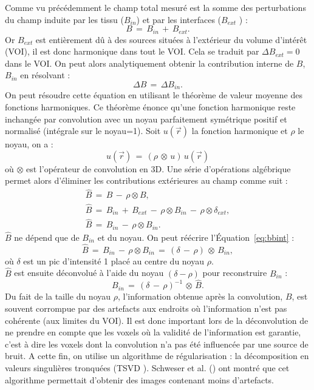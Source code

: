 {Comme vu précédemment le champ total mesuré est la somme des perturbations du champ induite
par les tissu ($B_{in}$) et par les interfaces ($B_{ext}$ ) :
\begin{equation}
B\,=\,B_{in}\,+\,B_{ext}.
\end{equation}
Or $B_{ext}$ est entièrement dû à des sources situées à l’extérieur du volume d’intérêt (VOI), il est donc
harmonique dans tout le VOI. Cela se traduit par $\Delta B_{ext} = 0$ dans le VOI. On peut alors analytiquement
obtenir la contribution interne de $B$, $B_{in}$ en résolvant :
\begin{equation}
\Delta B\,=\,\Delta B_{in}.
\end{equation}
On peut résoudre cette équation en utilisant le théorème de valeur moyenne des fonctions
harmoniques. Ce théorème énonce qu'une fonction harmonique reste inchangée par convolution avec
un noyau parfaitement symétrique positif et normalisé (intégrale sur le noyau=1). Soit $u(\vec{r})$ la fonction
harmonique et $\rho$ le noyau, on a :
\begin{equation}
u(\vec{r})\,=\,(\rho\, \otimes\,u)\,u(\vec{r})
\end{equation}
où $\otimes$ est l'opérateur de convolution en 3D. Une série d’opérations algébrique permet alors d'éliminer
les contributions extérieures au champ comme suit :
\begin{eqnarray}
\hat{B}\,=\,B\,-\,\rho\otimes B,\\
\hat{B}\,=\,B_{in}\,+\,B_{ext}\,-\,\rho\otimes B_{in}\,-\,\rho\otimes\delta_{ext},\\
\hat{B}\,=\,B_{in}\,-\,\rho\otimes B_{in}.\label{eq:bbint}
\end{eqnarray}
$\hat{B}$ ne dépend que de $B_{in}$ et du noyau. On peut réécrire l’Équation~\ref{eq:bbint} :
\begin{equation}
\hat{B}\,=\,B_{in}\,-\,\rho\otimes B_{in}\,=\,(\delta\,-\,\rho)\,\otimes\,B_{in},
\end{equation}
où $\delta$ est un pic d’intensité 1 placé au centre du noyau $\rho$.\\
$\hat{B}$ est ensuite déconvolué à l’aide du noyau $(\delta-\rho)$ pour reconstruire $B_{in}$ :
\begin{equation}
B_{in}\,=\,(\delta\,-\,\rho)^{-1}\,\otimes\,\hat{B}.
\end{equation}
Du fait de la taille du noyau $\rho$, l'information obtenue après la convolution, $B$, est souvent corrompue
par des artefacts aux endroits où l'information n'est pas cohérente (aux limites du VOI). Il est donc
important lors de la déconvolution de ne prendre en compte que les voxels où la validité de
l'information est garantie, c'est à dire les voxels dont la convolution n'a pas été influencée par une
source de bruit. A cette fin, on utilise un algorithme de régularisation : la décomposition en valeurs
singulières tronquées (TSVD \cite{Bertero2006}). Schweser et al. (\cite{Schweser2011}) ont montré que cet algorithme permettait d'obtenir
des images contenant moins d'artefacts.

}
